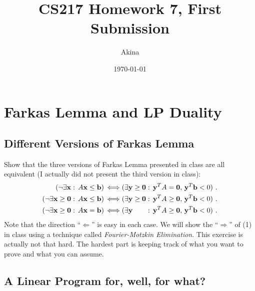 \documentclass[11pt,a4paper,oneside]{article}
\newcommand{\y}{\mathbf{y}}
\newcommand{\x}{\mathbf{x}}
\renewcommand{\b}{\mathbf{b}}
\newcommand{\zero}{\mathbf{0}}
\renewcommand{\hwtitle} {CS217 Homework 7, First Submission}
\renewcommand{\hwauthor}{Akina}
\renewcommand{\hwdate}{\today}
\begin{document}
\title{\hwtitle}
\author{\hwauthor}
\date{\hwdate}
\maketitle


\section{Farkas Lemma and LP Duality}

\subsection{Different Versions of Farkas Lemma}

\begin{problem}{1}
	\statement
 Show that the three versions of Farkas Lemma presented in class are all equivalent (I actually did not present
 the third version in class):
 \begin{align}
   ( \neg \exists \x : \, A \x \leq \b ) \, & \Longleftrightarrow 
    ( \exists \y \geq \zero : \, \y^T A = \zero, \,     \y^T \b < 0 ) \ . \\
      ( \neg \exists \x \geq \zero : \, A \x \leq \b ) \, & \Longleftrightarrow 
    ( \exists \y \geq \zero : \, \y^T A \geq \zero, \,  \y^T \b < 0 ) \ . \\
   ( \neg \exists \x \geq \zero : \, A \x = \b ) \, & \Longleftrightarrow 
    ( \exists \y \begingroup \color{white} \geq \zero \endgroup : \, \y^T A \geq \zero, \,  \y^T \b < 0 ) \ .
 \end{align}
  Note that the direction ``$\Longleftarrow$'' is easy in each case. 
  We will show the ``$\Longrightarrow$'' of (1) in class using a technique called {\em Fourier-Motzkin Elimination}. 
  This exercise is actually not that hard. The hardest part is keeping track of what you 
  want to prove and what you can assume.
    
    \solution

\end{problem}

\subsection{A Linear Program for, well, for what?}
\end{document}
